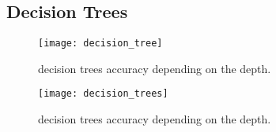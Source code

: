 
\subsection{Decision Trees}%
\label{sub:decision-trees}
\begin{figure}[H]
    \centering
    \texttt{[image: decision\_tree]}
    \caption{decision trees accuracy depending on the depth.}%
    \label{fig:decision_trees}
\end{figure}
\begin{figure}[H]
    \centering
    \texttt{[image: decision\_trees]}
    \caption{decision trees accuracy depending on the depth.}%
    \label{fig:decision_trees_acc}
\end{figure}

